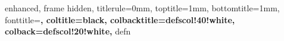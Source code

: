 {
  enhanced,
  frame hidden,
  titlerule=0mm,
  toptitle=1mm,
  bottomtitle=1mm,
  fonttitle=\bfseries\large,
  coltitle=black,
  colbacktitle=defscol!40!white,
  colback=defscol!20!white,
}{defn}








